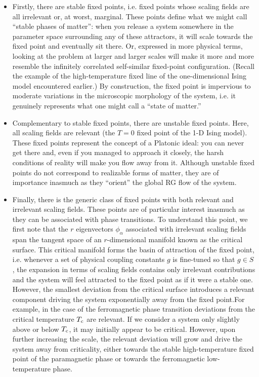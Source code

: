 \begin{itemize}
\item Firstly, there are stable fixed points, i.e. fixed points whose scaling fields are all irrelevant or, at worst, marginal. 
These points define what we might call ``stable phases of
matter'': when you release a system somewhere in the parameter space surrounding any of these attractors, it will scale towards the fixed point and eventually sit there. Or,
expressed in more physical terms, looking at the problem at larger and larger scales will make it more and more resemble the infinitely correlated self-similar fixed-point configuration. (Recall the example of the high-temperature fixed line of the one-dimensional Ising
model encountered earlier.) 
By construction, the fixed point is impervious to moderate
variations in the microscopic morphology of the system, i.e. it genuinely represents what one might call a ``state of matter.''
\item Complementary to stable fixed points, there are unstable fixed points. Here, all scaling fields are relevant (the $T = 0$ fixed point of the 1-D Ising model). These fixed points represent the concept of a Platonic ideal: you can never get there and, even if you managed to approach it closely, the harsh conditions of reality will make you flow away from it.
Although unstable fixed points do not correspond to realizable forms of matter, they are of importance inasmuch as they ``orient'' the global RG flow of the system.
\item Finally, there is the generic class of fixed points with both relevant and irrelevant scaling fields. These points are of particular interest inasmuch as they can be associated with phase transitions. 
To understand this point, we first note that the $r$ eigenvectors $\phi_{\alpha}$ associated with irrelevant scaling fields span the tangent space of an $r$-dimensional
manifold known as the critical surface. 
This critical manifold forms the basin of attraction of the fixed point, i.e. whenever a set of physical coupling constants $g$ is fine-tuned so that $g \in S$, the
expansion in terms of scaling fields contains only irrelevant contributions and the system will feel attracted to the fixed point as if it were a stable one.
However, the smallest deviation from the critical surface introduces a relevant component driving the system exponentially away from the fixed point.For example, in the case of the ferromagnetic phase transition  deviations from the critical temperature $T_{\rm c}$ are relevant.
If we consider a system only slightly above or below $T_{\rm c}$, it may initially appear to be critical. However, upon further increasing the scale, the relevant deviation will grow and drive the system away from criticality, either towards the stable high-temperature fixed point of the paramagnetic phase or towards the ferromagnetic low-temperature phase.
\end{itemize}

